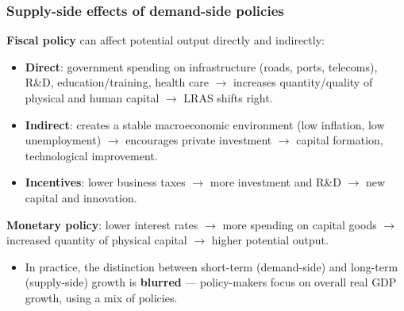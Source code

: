\subsubsection*{Supply-side effects of demand-side policies}
\textbf{Fiscal policy} can affect potential output directly and indirectly:
\begin{itemize}
  \item \textbf{Direct}: government spending on infrastructure (roads, ports, telecoms), R\&D, education/training, health care $\to$ increases quantity/quality of physical and human capital $\to$ LRAS shifts right.
  \item \textbf{Indirect}: creates a stable macroeconomic environment (low inflation, low unemployment) $\to$ encourages private investment $\to$ capital formation, technological improvement.
  \item \textbf{Incentives}: lower business taxes $\to$ more investment and R\&D $\to$ new capital and innovation.
\end{itemize}
\textbf{Monetary policy}: lower interest rates $\to$ more spending on capital goods $\to$ increased quantity of physical capital $\to$ higher potential output.
\begin{center}
\begin{itemize}
  \item In practice, the distinction between short-term (demand-side) and long-term (supply-side) growth is \textbf{blurred} --- policy-makers focus on overall real GDP growth, using a mix of policies.
\end{itemize}
\end{center}

